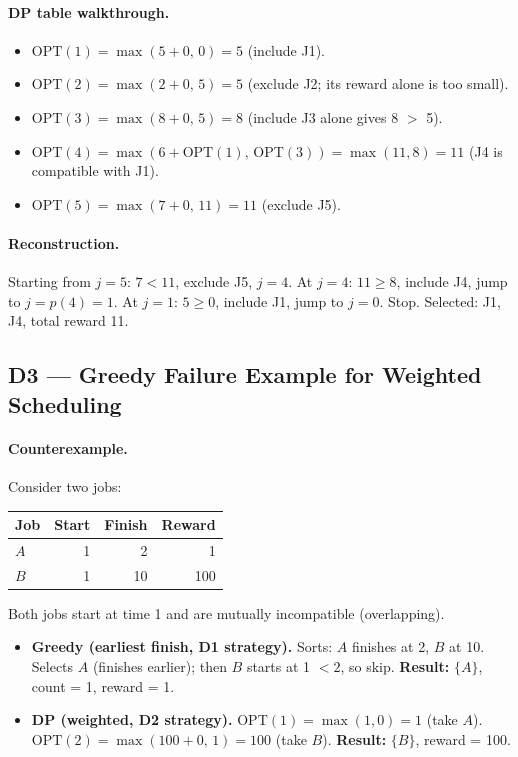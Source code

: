 \documentclass[11pt,a4paper]{article}
\begin{document}
\paragraph{DP table walkthrough.}
\begin{itemize}[noitemsep]
  \item $\mathrm{OPT}(1) = \max(5+0,\, 0) = 5$ \quad (include J1).
  \item $\mathrm{OPT}(2) = \max(2+0,\, 5) = 5$ \quad (exclude J2; its reward alone is too small).
  \item $\mathrm{OPT}(3) = \max(8+0,\, 5) = 8$ \quad (include J3 alone gives 8 $>$ 5).
  \item $\mathrm{OPT}(4) = \max(6+\mathrm{OPT}(1),\, \mathrm{OPT}(3)) = \max(11,8) = 11$ \quad (J4 is compatible with J1).
  \item $\mathrm{OPT}(5) = \max(7+0,\, 11) = 11$ \quad (exclude J5).
\end{itemize}

\paragraph{Reconstruction.}
Starting from $j=5$: $7 < 11$, exclude J5, $j=4$. At $j=4$: $11 \ge 8$, include J4, jump to $j=p(4)=1$. At $j=1$: $5 \ge 0$, include J1, jump to $j=0$. Stop. Selected: J1, J4, total reward 11.

\subsection{D3 --- Greedy Failure Example for Weighted Scheduling}

\paragraph{Counterexample.}
Consider two jobs:
\begin{center}
\begin{tabular}{lrrr}
\toprule
Job & Start & Finish & Reward \\ \midrule
$A$ & 1 & 2 & 1 \\
$B$ & 1 & 10 & 100 \\ \bottomrule
\end{tabular}
\end{center}

Both jobs start at time 1 and are mutually incompatible (overlapping).

\begin{itemize}
  \item \textbf{Greedy (earliest finish, D1 strategy).} Sorts: $A$ finishes at 2, $B$ at 10. Selects $A$ (finishes earlier); then $B$ starts at 1 $< 2$, so skip. \textbf{Result:} $\{A\}$, count = 1, reward = 1.
  \item \textbf{DP (weighted, D2 strategy).} $\mathrm{OPT}(1)=\max(1,0)=1$ (take $A$). $\mathrm{OPT}(2)=\max(100+0,\,1)=100$ (take $B$). \textbf{Result:} $\{B\}$, reward = 100.
\end{itemize}
\end{document}
